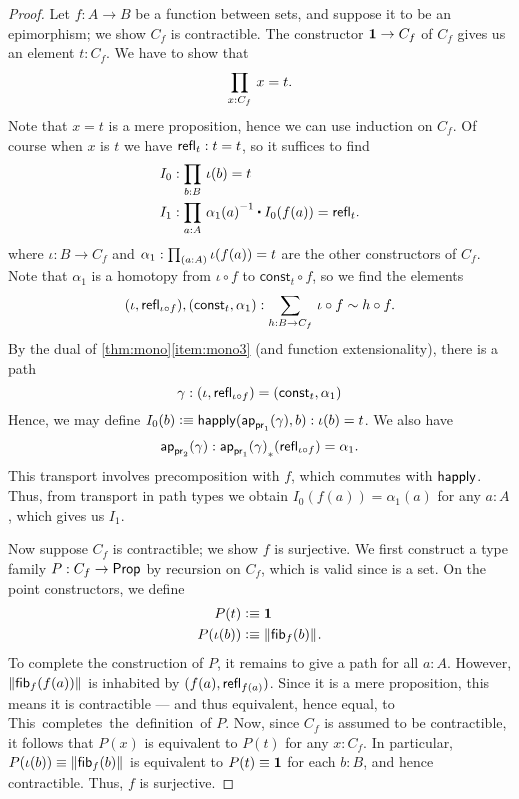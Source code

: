 \begin{proof}
Let $f:A\to B$ be a function between sets, and suppose it to be an epimorphism; we show $C_f$ is contractible.
The constructor $\mathbf{1}\to C_f$ of $C_f$ gives us an element $t:C_f$.
We have to show that
\begin{equation*}
\prd{x:C_f} x= t.
\end{equation*}
Note that $x= t$ is a mere proposition, hence we can use induction on $C_f$.
Of course when $x$ is $t$ we have $\mathsf{refl}_{t}:t=t$, so it suffices to find
\begin{align*}
I_0 & : \prd{b:B} \iota(b)= t\\
I_1 & : \prd{a:A} \opp{\alpha_1(a)} \ct I_0(f(a))=\refl{t}.
\end{align*}
where $\iota:B\to C_f$ and $\alpha_1:\prd{a:A} \iota(f(a))= t$ are the other constructors
of $C_f$. Note that $\alpha_1$ is a homotopy from $\iota\circ f$ to
$\mathsf{const}_t\circ f$, so we find the elements
\begin{equation*}
\pairr{\iota,\refl{\iota\circ f}},\pairr{\mathsf{const}_t,\alpha_1}:
\sm{h:B\to C_f} \iota\circ f \htpy h\circ f.
\end{equation*}
By the dual of \autoref{thm:mono}\ref{item:mono3} (and function extensionality), there is a path
\begin{equation*}
\gamma:{\mathopen{}(\iota,\mathsf{refl}_{\iota\circ f})\mathclose{}}={\mathopen{}(\mathsf{const}_t,\alpha_1)\mathclose{}}
\end{equation*}
Hence, we may define $I_0(b)\vcentcolon\equiv \mathsf{happly}(\mathsf{ap}_{\mathsf{pr}_{1}}(\gamma),b):\iota(b)=t$.
We also have
\[\mathsf{ap}_{\mathsf{pr}_{2}}(\gamma) : {\mathsf{ap}_{\mathsf{pr}_{1}}(\gamma)}_{*}\mathopen{}\left({\mathsf{refl}_{\iota\circ f}}\right)\mathclose{} = \alpha_1. \]
This transport involves precomposition with $f$, which commutes with $\mathsf{happly}$.
Thus, from transport in path types we obtain $I_0(f(a)) = \alpha_1(a)$ for any $a:A$, which gives us $I_1$.

Now suppose $C_f$ is contractible; we show $f$ is surjective.
We first construct a type family $P:C_f\to\mathsf{Prop}$ by recursion on $C_f$, which is valid since \prop is a set.
On the point constructors, we define
\begin{align*}
P(t) & \vcentcolon\equiv \mathbf{1}\\
P(\iota(b)) & \vcentcolon\equiv \mathopen{}\left\Vert {\mathsf{fib}}_{f}(b)\right\Vert_{}\mathclose{}.
\end{align*}
To complete the construction of $P$, it remains to give a path
for all $a:A$.
However, $\mathopen{}\left\Vert {\mathsf{fib}}_{f}(f(a))\right\Vert_{}\mathclose{}$ is inhabited by $(f(a),\mathsf{refl}_{f(a)})$.
Since it is a mere proposition, this means it is contractible --- and thus equivalent, hence equal, to \unit.
This completes the definition of $P$.
Now, since $C_f$ is assumed to be contractible, it follows that $P(x)$ is equivalent to $P(t)$ for any $x:C_f$.
In particular, $P(\iota(b))\equiv \mathopen{}\left\Vert {\mathsf{fib}}_{f}(b)\right\Vert_{}\mathclose{}$ is equivalent to $P(t)\equiv \mathbf{1}$ for each $b:B$, and hence contractible.
Thus, $f$ is surjective.


\end{proof}
